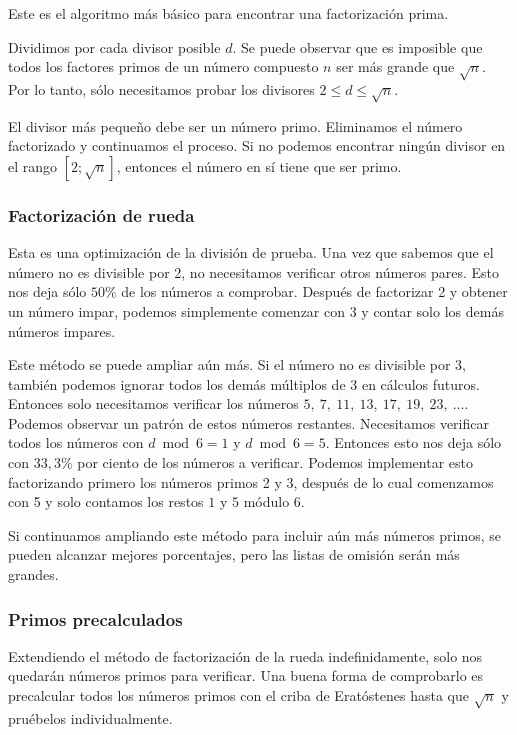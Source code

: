 Este es el algoritmo más básico para encontrar una factorización prima.

Dividimos por cada divisor posible $d$. Se puede observar que es imposible que todos los factores primos de un número compuesto $n$ ser más grande que $\sqrt{n}$. Por lo tanto, sólo necesitamos probar los divisores $2 \le d \le \sqrt{n}$.

El divisor más pequeño debe ser un número primo. Eliminamos el número factorizado y continuamos el proceso. Si no podemos encontrar ningún divisor en el rango $[2; \sqrt{n}]$, entonces el número en sí tiene que ser primo.

\subsubsection{Factorización de rueda}
Esta es una optimización de la división de prueba. Una vez que sabemos que el número no es divisible por 2, no necesitamos verificar otros números pares. Esto nos deja sólo $50\%$ de los números a comprobar. Después de factorizar 2 y obtener un número impar, podemos simplemente comenzar con 3 y contar solo los demás números impares.

Este método se puede ampliar aún más. Si el número no es divisible por 3, también podemos ignorar 
todos los demás múltiplos de 3 en cálculos futuros. Entonces solo necesitamos verificar los 
números $5,~7,~11,~13,~17,~19,~23,~\dots$. Podemos observar un patrón de estos números restantes. 
Necesitamos verificar todos los números con $d \bmod 6 = 1$ y $d \bmod 6 = 5$. Entonces esto nos 
deja sólo con $33,3\%$ por ciento de los números a verificar. Podemos implementar esto 
factorizando primero los números primos 2 y 3, después de lo cual comenzamos con 5 y solo 
contamos los restos $1$ y $5$ módulo $6$.

Si continuamos ampliando este método para incluir aún más números primos, se pueden alcanzar mejores porcentajes, pero las listas de omisión serán más grandes.

\subsubsection{Primos precalculados}

Extendiendo el método de factorización de la rueda indefinidamente, solo nos quedarán números primos para verificar. Una buena forma de comprobarlo es precalcular todos los números primos con el criba de Eratóstenes hasta que $\sqrt{n}$ y pruébelos individualmente.


